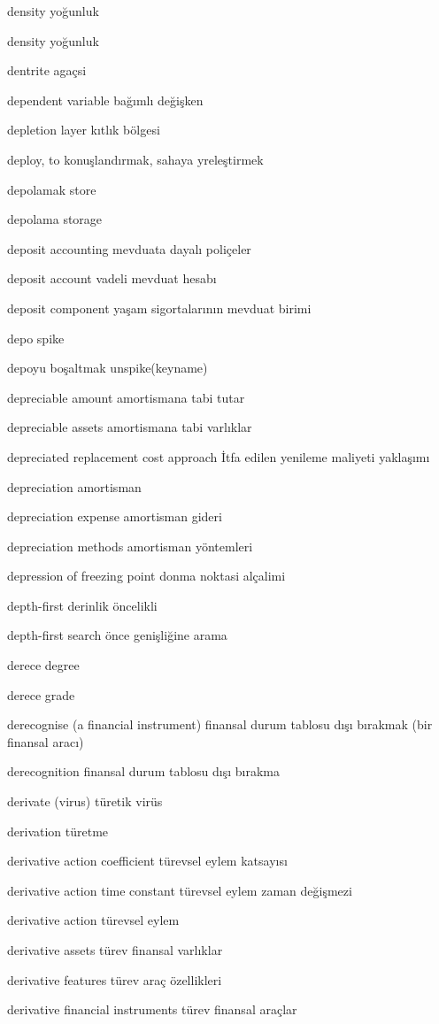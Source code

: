 \documentclass[12pt,fleqn]{article}\usepackage{../../common}
\begin{document}
density yoğunluk

density yoğunluk

dentrite agaçsi

dependent variable bağımlı değişken

depletion layer kıtlık bölgesi

deploy, to konuşlandırmak, sahaya yreleştirmek

depolamak store

depolama storage

deposit accounting mevduata dayalı poliçeler

deposit account vadeli mevduat hesabı

deposit component yaşam sigortalarının mevduat birimi

depo spike

depoyu boşaltmak unspike(keyname)

depreciable amount amortismana tabi tutar

depreciable assets amortismana tabi varlıklar

depreciated replacement cost approach İtfa edilen yenileme maliyeti yaklaşımı

depreciation amortisman

depreciation expense amortisman gideri

depreciation methods amortisman yöntemleri

depression of freezing point donma noktasi alçalimi

depth-first derinlik öncelikli

depth-first search önce genişliğine arama

derece degree

derece grade

derecognise (a financial instrument) finansal durum tablosu dışı bırakmak (bir finansal aracı)

derecognition finansal durum tablosu dışı bırakma

derivate (virus) türetik virüs

derivation türetme

derivative action coefficient türevsel eylem katsayısı

derivative action time constant türevsel eylem zaman değişmezi

derivative action türevsel eylem

derivative assets türev finansal varlıklar

derivative features türev araç özellikleri

derivative financial instruments türev finansal araçlar
\end{document}
